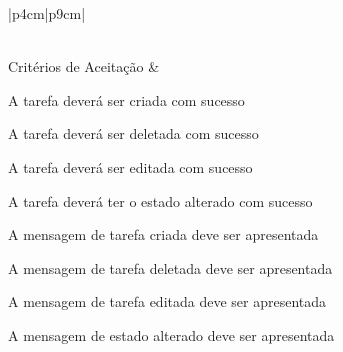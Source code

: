 \begin{tabela}{|p{4cm}|p{9cm}|}
\begin{enumalfa}{0.6}
    \end{enumalfa}\\
    \hline
    Critérios de Aceitação &
    \begin{enumalfa}{0.6}
        \item A tarefa deverá ser criada com sucesso
        \item A tarefa deverá ser deletada com sucesso
        \item A tarefa deverá ser editada com sucesso
        \item A tarefa deverá ter o estado alterado com sucesso
        \item A mensagem de tarefa criada deve ser apresentada
        \item A mensagem de tarefa deletada deve ser apresentada
        \item A mensagem de tarefa editada deve ser apresentada
        \item A mensagem de estado alterado deve ser apresentada
    \end{enumalfa}\\
    \hline
\end{tabela}

